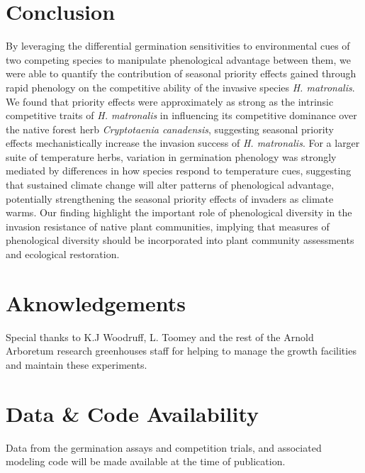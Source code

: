 \documentclass{article}[11pt]
\begin{document}
\section*{Conclusion}
By leveraging the differential germination sensitivities to environmental cues of two competing species to manipulate phenological advantage between them, we were able to quantify the contribution of seasonal priority effects gained through rapid phenology on the competitive ability of the invasive species \textit{H. matronalis}. We found that priority effects were approximately as strong as the intrinsic competitive traits of \textit{H. matronalis} in influencing its competitive dominance over the native forest herb \textit{Cryptotaenia canadensis}, suggesting seasonal priority effects mechanistically increase the invasion success of \textit{H. matronalis}. For a larger suite of temperature herbs, variation in germination phenology was strongly mediated by differences in how species respond to temperature cues, suggesting that sustained climate change will alter patterns of phenological advantage, potentially strengthening the seasonal priority effects of invaders as climate warms. Our finding highlight the important role of phenological diversity in the invasion resistance of native plant communities, implying that measures of phenological diversity should be incorporated into plant community assessments and ecological restoration. 

\section*{Aknowledgements}
Special thanks to K.J Woodruff, L. Toomey and the rest of the Arnold Arboretum research greenhouses staff for helping to manage the growth facilities and maintain these experiments.

\section*{Data \& Code Availability}
Data from the germination assays and competition trials, and associated modeling code will be made available at the time of publication.


\end{document}
